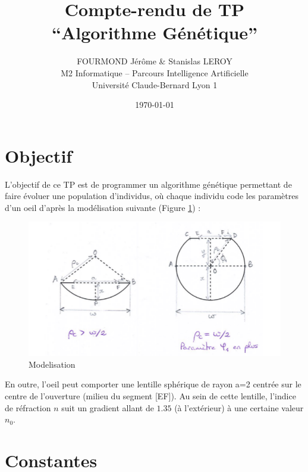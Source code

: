 \documentclass[a4paper,11pt]{article}
\begin{document}
\title{Compte-rendu de TP \\``Algorithme Génétique''}
\author{FOURMOND Jérôme \& Stanislas LEROY
\\ M2 Informatique – Parcours Intelligence Artificielle
\\Université Claude-Bernard Lyon 1}
\date{\today}
\maketitle

\tableofcontents
\newpage

\section{Objectif}

L'objectif de ce TP est de programmer un algorithme génétique permettant de faire évoluer une population d'individus, où chaque individu code les paramètres d'un oeil d'après la modélisation suivante (Figure \ref{fig:modelisation}) :

\begin{figure}[htbp]
\begin{center}
\includegraphics[width=15cm]{modelisation.png}
\caption{Modelisation}
\label{fig:modelisation}
\end{center}
\end{figure}

En outre, l'oeil peut comporter une lentille sphérique de rayon a=2 centrée sur le centre de l'ouverture (milieu du segment [EF]). Au sein de cette lentille, l'indice de réfraction $n$ suit un gradient allant de $1.35$ (à l'extérieur) à une certaine valeur $n_{0}$.

\section{Constantes}
\end{document}
